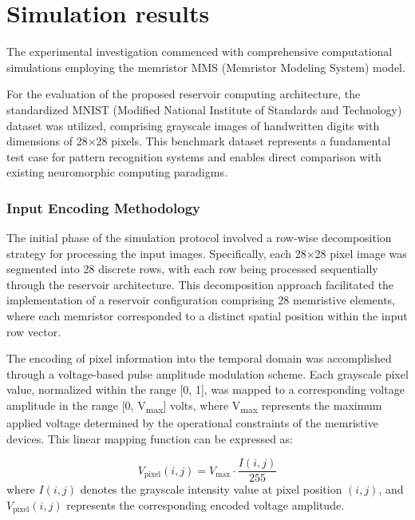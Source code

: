 \documentclass[11pt, oneside]{article}
\begin{document}
\section{Simulation results}

The experimental investigation commenced with comprehensive computational simulations employing the memristor MMS (Memristor Modeling System) model.

For the evaluation of the proposed reservoir computing architecture, the standardized MNIST (Modified National Institute of Standards and Technology) dataset was utilized, comprising grayscale images of handwritten digits with dimensions of 28×28 pixels. This benchmark dataset represents a fundamental test case for pattern recognition systems and enables direct comparison with existing neuromorphic computing paradigms.

\subsubsection{Input Encoding Methodology}

The initial phase of the simulation protocol involved a row-wise decomposition strategy for processing the input images. Specifically, each 28×28 pixel image was segmented into 28 discrete rows, with each row being processed sequentially through the reservoir architecture. This decomposition approach facilitated the implementation of a reservoir configuration comprising 28 memristive elements, where each memristor corresponded to a distinct spatial position within the input row vector.

The encoding of pixel information into the temporal domain was accomplished through a voltage-based pulse amplitude modulation scheme. Each grayscale pixel value, normalized within the range [0, 1], was mapped to a corresponding voltage amplitude in the range [0, V\textsubscript{max}] volts, where V\textsubscript{max} represents the maximum applied voltage determined by the operational constraints of the memristive devices. This linear mapping function can be expressed as:

\begin{equation}
    V_{\text{pixel}}(i,j) = V_{\text{max}} \cdot \frac{I(i,j)}{255}
\end{equation}
where $I(i,j)$ denotes the grayscale intensity value at pixel position $(i,j)$, and $V_{\text{pixel}}(i,j)$ represents the corresponding encoded voltage amplitude.





\printbibliography
\end{document}
